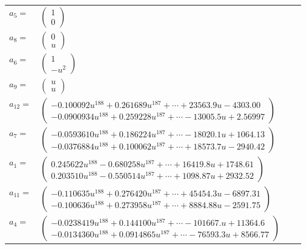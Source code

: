 \documentclass[1p]{elsarticle_modified}
\theoremstyle{definition}
\begin{document}
\begin{tabular}{m{7pt} m{180pt} m{7pt} m{180pt} }
\flushright $a_{5}=$&$\begin{pmatrix}1\\0\end{pmatrix}$ \\
\flushright $a_{8}=$&$\begin{pmatrix}0\\u\end{pmatrix}$ \\
\flushright $a_{6}=$&$\begin{pmatrix}1\\- u^2\end{pmatrix}$ \\
\flushright $a_{9}=$&$\begin{pmatrix}u\\u\end{pmatrix}$ \\
\flushright $a_{12}=$&$\begin{pmatrix}-0.100092 u^{188}+0.261689 u^{187}+\cdots+23563.9 u-4303.00\\-0.0900934 u^{188}+0.259228 u^{187}+\cdots-13005.5 u+2.56997\end{pmatrix}$ \\
\flushright $a_{7}=$&$\begin{pmatrix}-0.0593610 u^{188}+0.186224 u^{187}+\cdots-18020.1 u+1064.13\\-0.0376884 u^{188}+0.100062 u^{187}+\cdots+18573.7 u-2940.42\end{pmatrix}$ \\
\flushright $a_{1}=$&$\begin{pmatrix}0.245622 u^{188}-0.680258 u^{187}+\cdots+16419.8 u+1748.61\\0.203510 u^{188}-0.550514 u^{187}+\cdots+1098.87 u+2932.52\end{pmatrix}$ \\
\flushright $a_{11}=$&$\begin{pmatrix}-0.110635 u^{188}+0.276420 u^{187}+\cdots+45454.3 u-6897.31\\-0.100636 u^{188}+0.273958 u^{187}+\cdots+8884.88 u-2591.75\end{pmatrix}$ \\
\flushright $a_{4}=$&$\begin{pmatrix}-0.0238419 u^{188}+0.144100 u^{187}+\cdots-101667. u+11364.6\\-0.0134360 u^{188}+0.0914865 u^{187}+\cdots-76593.3 u+8566.77\end{pmatrix}$ \\

\end{tabular}
\end{document}
